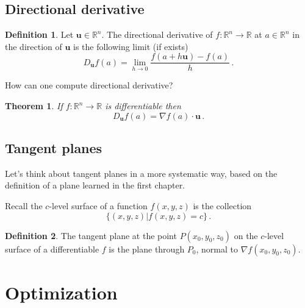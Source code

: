 \documentclass[
]{book}
\newtheorem{theorem}{Theorem}[chapter]
\theoremstyle{definition}
\newtheorem{definition}{Definition}[chapter]
\theoremstyle{definition}
\theoremstyle{definition}
\theoremstyle{definition}
\theoremstyle{remark}
\begin{document}
\hypertarget{directional-derivative}{%
\section{Directional derivative}\label{directional-derivative}}

\begin{definition}
Let \(\mathbf{u} \in \mathbb{R}^n\). The directional derivative of \(f:\mathbb{R}^n \to \mathbb{R}\) at \(a\in \mathbb{R}^n\)
in the direction of \(\mathbf{u}\) is the following limit (if exists)
\begin{equation*}
    D_{\mathbf{u}} f(a) = \lim_{h \to 0} \frac{ f( a + h \mathbf{u}) - f(a)}{h}\,.
\end{equation*}
\end{definition}

How can one compute directional derivative?

\begin{theorem}
If \(f:\mathbb{R}^n \to \mathbb{R}\) is differentiable then
\begin{equation*}
    D_{\mathbf{u}} f(a) = \nabla f(a) \cdot \mathbf{u} \,.
\end{equation*}
\end{theorem}

\hypertarget{tangent-planes}{%
\section{Tangent planes}\label{tangent-planes}}

Let's think about tangent planes in a more systematic way, based on the definition
of a plane learned in the first chapter.

Recall the \(c\)-level surface of a function \(f(x,y,z)\) is the collection
\begin{equation*}
    \{ (x,y,z) | f(x,y,z) = c \} \,.
\end{equation*}

\begin{definition}
The tangent plane at the point \(P(x_0, y_0, z_0)\) on the \(c\)-level surface of a differentiable \(f\)
is the plane through \(P_0\), normal to \(\nabla f (x_0, y_0, z_0)\).
\end{definition}

\newpage

\hypertarget{optimization}{%
\chapter{Optimization}\label{optimization}}
\end{document}
